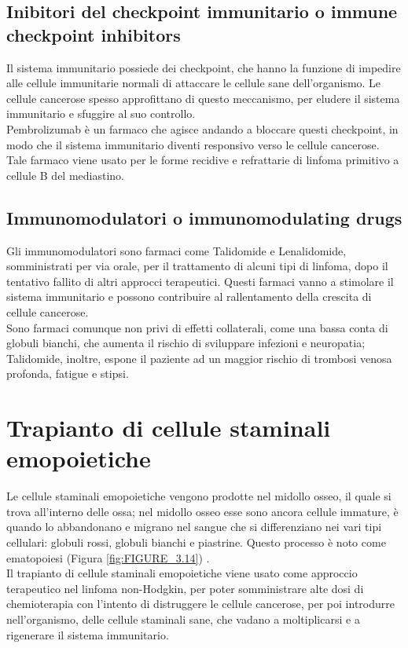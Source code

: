 \subsection{Inibitori del checkpoint immunitario o immune checkpoint inhibitors}

Il sistema immunitario possiede dei checkpoint, che hanno la funzione di impedire alle cellule immunitarie normali di 
attaccare le cellule sane dell’organismo. Le cellule cancerose spesso approfittano di questo meccanismo, per eludere il 
sistema immunitario e sfuggire al suo controllo.\\ 
Pembrolizumab è un farmaco che agisce andando a bloccare questi checkpoint, in modo che il sistema immunitario 
diventi responsivo verso le cellule cancerose. Tale farmaco viene usato per le forme recidive e refrattarie di linfoma 
primitivo a cellule B del mediastino\cite{IMMUNOTP}.

\subsection{Immunomodulatori o immunomodulating drugs}

Gli immunomodulatori sono farmaci come Talidomide e Lenalidomide, somministrati per via orale, per il trattamento di 
alcuni tipi di linfoma, dopo il tentativo fallito di altri approcci terapeutici\cite{MASSIVEBIO}.
Questi farmaci vanno a stimolare il sistema immunitario e possono contribuire al rallentamento della crescita di 
cellule cancerose.\\
Sono farmaci comunque non privi di effetti collaterali, come una bassa conta di globuli bianchi, che aumenta il 
rischio di sviluppare infezioni e neuropatia; Talidomide, inoltre, espone il paziente ad un maggior rischio di trombosi 
venosa profonda, fatigue e stipsi\cite{IMMUNOTP}.

\section{Trapianto di cellule staminali emopoietiche}

Le cellule staminali emopoietiche vengono prodotte nel midollo osseo, il quale si trova all’interno delle ossa; 
nel midollo osseo esse sono ancora cellule immature, è quando lo abbandonano e migrano nel sangue che si 
differenziano nei vari tipi cellulari: globuli rossi, globuli bianchi e piastrine. 
Questo processo è noto come ematopoiesi (Figura \ref{fig:FIGURE_3.14}) \cite{TRAPIANTO}.\\
Il trapianto di cellule staminali emopoietiche viene usato come approccio terapeutico nel linfoma non-Hodgkin, per 
poter somministrare alte dosi di chemioterapia con l'intento di distruggere le cellule cancerose, per poi introdurre 
nell’organismo, delle cellule staminali sane, che vadano a moltiplicarsi e a rigenerare il sistema immunitario.

